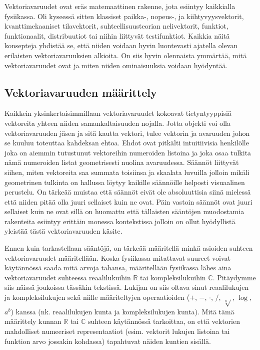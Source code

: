 \documentclass[../johdoksia.tex]{subfiles}
\begin{document}
	Vektoriavaruudet ovat eräs matemaattinen rakenne, jota esiintyy kaikkialla fysiikassa. Oli kyseessä sitten klassiset paikka-, nopeus-, ja kiihtyvyysvektorit, kvanttimekaaniset tilavektorit, suhteellisuusteorian nelivektorit, funktiot, funktionaalit, distribuutiot tai niihin liittyvät testifunktiot. Kaikkia näitä konsepteja yhdistää se, että niiden voidaan hyvin luontevasti ajatella olevan erilaisten vektoriavaruuksien alkioita. On siis hyvin olennaista ymmärtää, mitä vektoriavaruudet ovat ja miten niiden ominaisuuksia voidaan hyödyntää.
	
	\subsection{Vektoriavaruuden määrittely}
	
	Kaikkein yksinkertaisimmillaan vektoriavaruudet kokoavat tietyntyyppisiä vektoreita yhteen niiden samankaltaisuuden nojalla. Jotta objekti voi olla vektoriavaruuden jäsen ja sitä kautta vektori, tulee vektorin ja avaruuden johon se kuuluu toteuttaa kahdeksan ehtoa. Ehdot ovat pitkälti intuitiivisia henkilölle joka on aiemmin tutustunut vektoreihin numeroiden listoina ja joka osaa tulkita nämä numeroiden listat geometrisesti nuolina avaruudessa. Säännöt liittyvät siihen, miten vektoreita saa summata toisiinsa ja skaalata luvuilla jolloin mikäli geometrinen tulkinta on hallussa löytyy kaikille säännöille helposti visuaalinen perustelu. On tärkeää muistaa että säännöt eivät ole absoluuttisia siinä mielessä että niiden pitää olla juuri sellaiset kuin ne ovat. Päin vastoin säännöt ovat juuri sellaiset kuin ne ovat sillä on huomattu että tällaisten sääntöjen muodostamia rakenteita esiintyy erittäin monessa kontekstissa jolloin on ollut hyödyllistä yleistää tästä vektoriavaruuden käsite.
	
	Ennen kuin tarkastellaan sääntöjä, on tärkeää määritellä minkä asioiden suhteen vektoriavaruudet määritellään. Koska fysiikassa mitattavat suureet voivat käytännössä saada mitä arvoja tahansa, määritellään fysiikassa lähes aina vektoriavaruudet suhteessa reaalilukuihin $\mathbb{R}$ tai kompleksilukuihin $\mathbb{C}$. Pitäydymme siis näissä joukoissa tässäkin tekstissä. Lukijan on siis oltava sinut reaalilukujen ja kompleksilukujen sekä niille määriteltyjen operaatioiden ($+$, $-$, $\cdot$, $/$, $\sqrt[n]{}$, $\log$, $a^b$) kanssa (nk. reaalilukujen kunta ja kompleksilukujen kunta). Mitä tämä määrittely kunnan $\mathbb{R}$ tai $\mathbb{C}$ suhteen käytännössä tarkoittaa, on että vektorien mahdolliset numeeriset representaatiot (esim. vektorit lukujen listoina tai funktion arvo jossakin kohdassa) tapahtuvat näiden kuntien sisällä.
	
\end{document}
